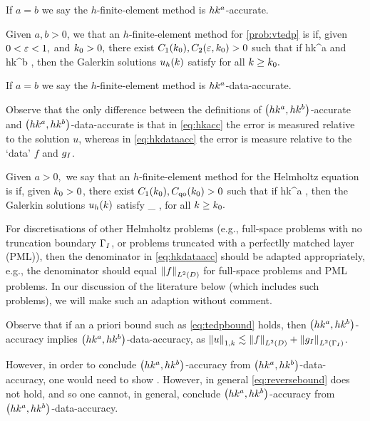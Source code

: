 If $a=b$ we say the $h$-finite-element method is $hk^{a}$-accurate.
\ede

\label{def:hkdataacc}
Given $a,b>0$, we that an $h$-finite-element method for \cref{prob:vtedp} is  if, given $0 < \varepsilon < 1,$ and $k_{0} > 0,$ there exist $C_{1}(k_{0}), C_{2}(\varepsilon,k_{0}) > 0$ such that if
\beqs
hk^a \leq \Co
\eeqs
and
\beqs
hk^b \leq \Ct,
\eeqs
then the Galerkin solutions $u_{h}(k)$ satisfy
\beq\label{eq:hkdataacc}
 \leq \eps
\eeq
for all $k \geq k_{0}.$

If $a=b$ we say the $h$-finite-element method is $hk^{a}$-data-accurate.
\ede

Observe that the only difference between the definitions of $\hk{a}{b}$-accurate and $\hk{a}{b}$-data-accurate is that in \cref{eq:hkacc} the error is measured relative to the solution $u$, whereas in \cref{eq:hkdataacc} the error is measure relative to the `data' $f$ and $g_{I}$.

\label{def:hkqo}
Given $a > 0,$ we say that an $h$-finite-element method for the Helmholtz equation is  if, given $k_{0} > 0$, there exist $C_{1}(k_{0}), C_{\mathrm{qo}}(k_{0}) > 0$ such that if
\beqs
hk^{a} \leq \Co,
\eeqs
then the Galerkin solutions $u_{h}(k)$ satisfy
\beqs
{} \leq \Cqo \inf_{\vh \in \Vhp} ,
\eeqs
for all $k \geq k_{0}.$
\ede

For discretisations of other Helmholtz problems (e.g., full-space problems with no truncation boundary $\Gamma_{I}$, or problems truncated with a perfectlly matched layer (PML)), then the denominator in \cref{eq:hkdataacc} should be adapted appropriately, e.g., the denominator should equal $\NLtD{f}$ for full-space problems and PML problems. In our discussion of the literature below (which includes such problems), we will make such an adaption without comment.
\ere

Observe that if an a priori bound such as \cref{eq:tedpbound} holds, then $\hk{a}{b}$-accuracy implies $\hk{a}b$-data-accuracy, as $\NW{u} \lesssim \NLtD{f} + \NLtGI{\gI}$.

However, in order to conclude $\hk{a}{b}$-accuracy from $\hk{a}b$-data-accuracy, one would need to show
\beq\label{eq:reversebound}
 \lesssim {}.
\eeq
However, in general \cref{eq:reversebound} does not hold, and so one cannot, in general, conclude $\hk{a}{b}$-accuracy from $\hk{a}{b}$-data-accuracy.
\ere

